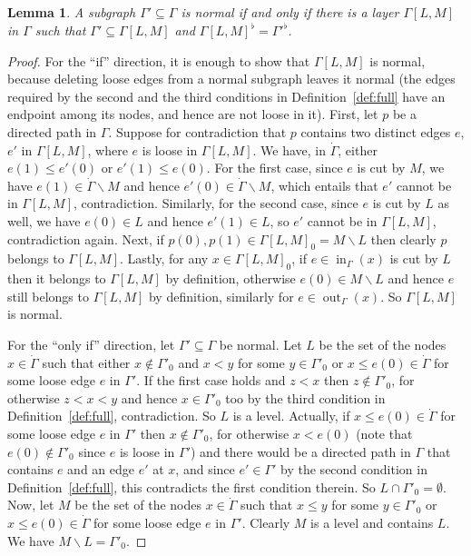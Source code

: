 \documentclass[12pt]{amsart}
\theoremstyle{plain}
\newtheorem{lem}[thm]{Lemma}
\theoremstyle{definition}
\theoremstyle{remark}
\numberwithin{equation}{section}
\theoremstyle{plain}
\newcommand{\0}{\emptyset}
\newcommand{\sub}{\subseteq}
\newcommand{\mi}{\smallsetminus}
\DeclareMathOperator{\out}{out}
\DeclareMathOperator{\inn}{in}
\begin{document}
\begin{lem}\label{full:lay}
A subgraph $\Gamma' \sub \Gamma$ is normal if and only if there is a layer $\Gamma[L, M]$ in $\Gamma$ such that $\Gamma' \sub \Gamma[L, M]$ and $\Gamma[L, M]^\flat = \Gamma'^{\flat}$.
\end{lem}
\begin{proof}
For the ``if'' direction, it is enough to show that $\Gamma[L, M]$ is normal, because deleting loose edges from a normal subgraph leaves it normal (the edges required by the second and the third conditions in Definition~\ref{def:full} have an endpoint among its nodes, and hence are not loose in it). First, let $p$ be a directed path in $\Gamma$. Suppose for contradiction that $p$ contains two distinct edges $e$, $e'$ in $\Gamma[L, M]$, where $e$ is loose in $\Gamma[L, M]$. We have, in $\dot \Gamma$, either $e(1) \leq e'(0)$ or $e'(1) \leq e(0)$. For the first case, since $e$ is cut by $M$, we have $e(1) \in \dot \Gamma \mi M$ and hence $e'(0) \in \dot \Gamma \mi M$, which entails that  $e'$ cannot be in $\Gamma[L, M]$, contradiction. Similarly, for the second case, since $e$ is cut by $L$ as well, we have $e(0) \in L$ and hence $e'(1) \in  L$, so  $e'$ cannot be in $\Gamma[L, M]$, contradiction again. Next, if $p(0), p(1) \in \Gamma[L, M]_0 = M \mi L$ then clearly $p$ belongs to $\Gamma[L, M]$. Lastly, for any $x \in \Gamma[L, M]_0$, if $e \in \inn_\Gamma(x)$ is cut by $L$ then it belongs to $\Gamma[L, M]$ by definition, otherwise $e(0) \in M \mi L$ and hence $e$ still belongs to $\Gamma[L, M]$ by definition, similarly for $e \in \out_\Gamma(x)$. So $\Gamma[L, M]$ is normal.

For the ``only if'' direction, let $\Gamma' \sub \Gamma$ be normal. Let $L$ be the set of the nodes $x \in \dot \Gamma$ such that either $x \notin \Gamma'_0$ and $x < y$ for some $y \in \Gamma'_0$ or $x \leq  e(0) \in \dot \Gamma$ for some loose edge $e$ in $\Gamma'$. If the first case holds and $z < x$ then $z \notin \Gamma'_0$, for otherwise $z < x < y$ and hence $x \in \Gamma'_0$ too by the third condition in Definition~\ref{def:full}, contradiction. So $L$ is a level. Actually, if $x \leq  e(0) \in \dot \Gamma$ for some loose edge $e$ in $\Gamma'$  then $x \notin  \Gamma'_0$, for otherwise $x < e(0)$ (note that $e(0) \notin \Gamma'_0$ since $e$ is loose in $\Gamma'$) and there would be a directed path in $\Gamma$ that contains $e$ and an edge $e'$ at $x$, and since $e' \in \Gamma'$ by the second condition in Definition~\ref{def:full}, this contradicts the first condition therein. So  $L \cap \Gamma'_0 = \0$. Now, let $M$ be the set of the nodes $x \in \dot \Gamma$ such that $x \leq y$ for some $y \in \Gamma'_0$ or $x \leq e(0) \in \dot \Gamma$ for some loose edge $e$ in $\Gamma'$.  Clearly $M$ is a level and contains $L$. We have $M \mi L = \Gamma'_0$.


\end{proof}
\end{document}

